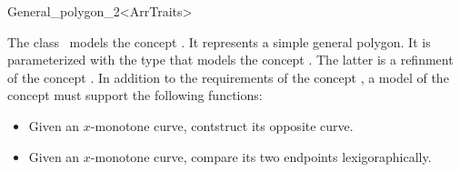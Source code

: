 \ccRefPageBegin

\begin{ccRefClass}{General_polygon_2<ArrTraits>}

\ccThreeToTwo

\ccDefinition
The class \ccRefName\ models the concept .
It represents a simple general polygon. It is parameterized with the type
 that models the concept
. The latter is a refinment
of the concept . In addition to the
requirements of the concept , a
model of the concept  must
support the following functions:
\begin{itemize}
\item Given an $x$-monotone curve, contstruct its opposite curve.
\item Given an $x$-monotone curve, compare its two endpoints lexigoraphically.
\end{itemize}

 
\ccIsModel

\end{ccRefClass}
\ccRefPageEnd
